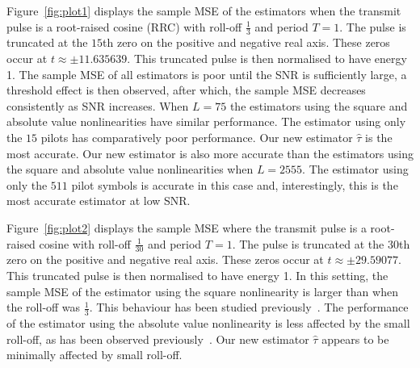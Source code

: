 \documentclass[journal]{IEEEtranTCOM}
\begin{document}
Figure~\ref{fig:plot1} displays the sample MSE of the estimators when the transmit pulse is a root-raised cosine (RRC) with roll-off $\tfrac{1}{3}$ and period $T = 1$.  The pulse is truncated at the $15$th zero on the positive and negative real axis.  These zeros occur at $t \approx \pm 11.635639$.  This truncated pulse is then normalised to have energy 1.  The sample MSE of all estimators is poor until the SNR is sufficiently large, a threshold effect is then observed, after which, the sample MSE decreases consistently as SNR increases.  When $L=75$ the estimators using the square and absolute value nonlinearities have similar performance.  The estimator using only the $15$ pilots has comparatively poor performance.  Our new estimator $\hat{\tau}$ is the most accurate.
Our new estimator is also more accurate than the estimators using the square and absolute value nonlinearities when $L=2555$.  The estimator using only the $511$ pilot symbols is accurate in this case and, interestingly, this is the most accurate estimator at low SNR.  %

Figure~\ref{fig:plot2} displays the sample MSE where the transmit pulse is a root-raised cosine with roll-off $\tfrac{1}{30}$ and period $T = 1$.  The pulse is truncated at the $30$th zero on the positive and negative real axis.  These zeros occur at $t \approx \pm 29.59077$.   This truncated pulse is then normalised to have energy 1.  In this setting, the sample MSE of the estimator using the square nonlinearity is larger than when the roll-off was $\tfrac{1}{3}$.  This behaviour has been studied previously~\cite{Oerder_synch_square_circstat_1988}.  The performance of the estimator using the absolute value nonlinearity is less affected by the small roll-off, as has been observed previously~\cite{Panayirci_eval_per_symbtim_1996,Morelli_symbtime_feedforward_1997}.  Our new estimator $\hat{\tau}$ appears to be minimally affected by small roll-off.  %
\end{document}
